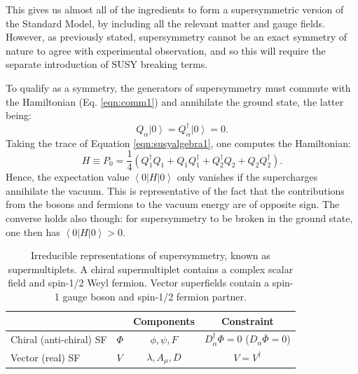 This gives us almost all of the ingredients to form a supersymmetric version of the Standard Model, by including all the relevant matter and gauge fields. However, as previously stated, supersymmetry cannot be an exact symmetry of nature to agree with experimental observation, and so this will require the separate introduction of SUSY breaking terms.

To qualify as a symmetry, the generators of supersymmetry must commute with the Hamiltonian (Eq. \ref{eqn:comm1}) and annihilate the ground state, the latter being:
\begin{equation}
Q_{\alpha}\left|0\right>=Q^{\dagger}_{\dot{\alpha}}\left|0\right>=0.
\end{equation}
Taking the trace of Equation \ref{eqn:susyalgebra1}, one computes the Hamiltonian:
\begin{equation}
H\equiv P_{0}=\frac{1}{4} \left(Q^{\dagger}_{1}Q_{1}+Q_{1}Q^{\dagger}_{1}+Q^{\dagger}_{2}Q_{2}+Q_{2}Q^{\dagger}_{2}\right).
\end{equation}
Hence, the expectation value $\left<0\right|H\left|0\right>$ only vanishes if the supercharges annihilate the vacuum. This is representative of the fact that the contributions from the bosons and fermions to the vacuum energy are of opposite sign. The converse holds also though: for supersymmetry to be broken in the ground state, one then has $\left<0\right|H\left|0\right> >0$.

\begin{table}[t]
\centering
\caption[Irreducible representations of supersymmetry.]{Irreducible representations of supersymmetry, known as supermultiplets. A chiral supermultiplet contains a complex scalar field and spin-1/2 Weyl fermion. Vector superfields contain a spin-1 gauge boson and spin-1/2 fermion partner.}
\label{tab:supermultiplets}
\begin{tabular}{|l|l|c|c|}
\hline
\multicolumn{2}{|c|}{} & Components           & Constraint      \\ \hline
Chiral (anti-chiral) SF       & $\Phi$ & $\phi,\psi,F$    & $D^{\dagger}_{\dot{\alpha}}\Phi=0$ ($D_{\alpha}\overline{\Phi}=0$)      \\ \hline
Vector (real) SF & $V$    & $\lambda,A_{\mu},D$ & $V=V^{\dagger}$ \\ \hline
\end{tabular}
\end{table}

